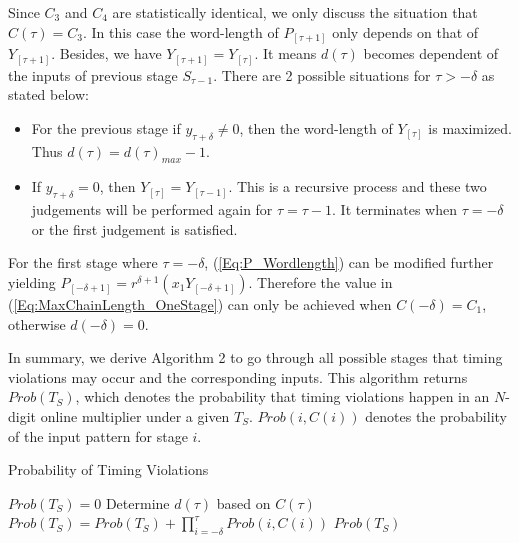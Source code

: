\documentclass{acm_proc_article-sp}
\begin{document}
Since $C_3$ and $C_4$ are statistically identical, we only discuss the situation that $C(\tau)=C_3$. In this case the word-length of $P_{[\tau+1]}$ only depends on that of $Y_{[\tau+1]}$. Besides, we have $Y_{[\tau+1]}=Y_{[\tau]}$. It means $d(\tau)$ becomes dependent of the inputs of previous stage $S_{\tau-1}$. There are 2 possible situations for $\tau>-\delta$ as stated below:
\vspace{-1ex}
\begin{itemize}
  \item For the previous stage if $y_{\tau+\delta}\neq0$, then the word-length of $Y_{[\tau]}$ is maximized. Thus $d(\tau)=d(\tau)_{max}-1$.
  \item If $y_{\tau+\delta}=0$, then $Y_{[\tau]}=Y_{[\tau-1]}$. This is a recursive process and these two judgements will be performed again for $\tau=\tau-1$. It terminates when $\tau=-\delta$ or the first judgement is satisfied.
\end{itemize}
\vspace{-1ex}
For the first stage where $\tau=-\delta$, (\ref{Eq:P_Wordlength}) can be modified further yielding $P_{[-\delta+1]}=r^{\delta+1}(x_1Y_{[-\delta+1]})$. Therefore the value in (\ref{Eq:MaxChainLength_OneStage}) can only be achieved when $C(-\delta)=C_1$, otherwise $d(-\delta)=0$.

In summary, we derive Algorithm 2 to go through all possible stages that timing violations may occur and the corresponding inputs. This algorithm returns $Prob(T_S)$, which denotes the probability that timing violations happen in an $N$-digit online multiplier under a given $T_S$. $Prob(i,C(i))$ denotes the probability of the input pattern for stage $i$.
%
\begin{algorithm}[htbp]
  \caption{Probability of Timing Violations}
  \begin{algorithmic}[1]
    \STATE  $Prob(T_S)=0$
    \STATE  Determine $d(\tau)$ based on $C(\tau)$
    \STATE  $Prob(T_S)=Prob(T_S)+\prod_{i=-\delta}^{\tau}Prob(i,C(i))$
    \ENDIF
    \ENDFOR
    \RETURN $Prob(T_S)$
  \label{Algorithm:ProbabilityTimingViolation}
  \end{algorithmic}
\end{algorithm}
\end{document}
